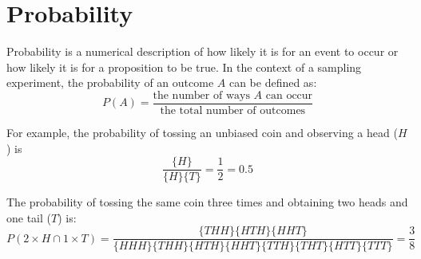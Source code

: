 \chapter{Probability}
\label{ch:probability}

Probability is a numerical description of how likely it is for an
event to occur or how likely it is for a proposition to be true.  In
the context of a sampling experiment, the probability of an outcome
$A$ can be defined as:
\begin{equation}
P(A) = \frac{\mbox{the number of ways }A\mbox{ can occur}}
{\mbox{the total number of outcomes}}
\end{equation}

For example, the probability of tossing an unbiased coin and observing
a head ($H$) is
\[
\frac{
  \{H\}
}{
  \{H\}\{T\}
} = \frac{1}{2} = 0.5
\]

The probability of tossing the same coin three times and obtaining two
heads and one tail ($T$) is:
\begin{equation}
  P\!\left(2\times{H} \cap 1\times{T}\right) =
  \frac{
    \{THH\}\{HTH\}\{HHT\}
  }{
    \{HHH\}\{THH\}\{HTH\}\{HHT\}\{TTH\}\{THT\}\{HTT\}\{TTT\}
  } = \frac{3}{8}
  \label{eq:2H1T}
\end{equation}

